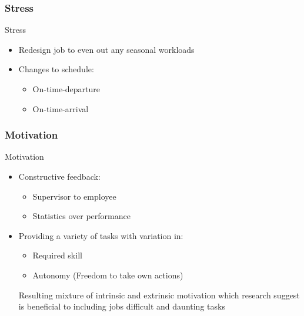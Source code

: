 \subsubsection{Stress}
\begin{frame}{Stress}{}
    \begin{itemize}
        \item Redesign job to even out any seasonal workloads
        \item Changes to schedule:
            \begin{itemize}
                \item On-time-departure
                \item On-time-arrival
            \end{itemize}
    \end{itemize}
\end{frame}

\subsubsection{Motivation}
\begin{frame}{Motivation}{}
    \begin{itemize}
        \item Constructive feedback:
            \begin{itemize}
                \item Supervisor to employee
                \item Statistics over performance
            \end{itemize}
        \item Providing a variety of tasks with variation in:
            \begin{itemize}
                \item Required skill
                \item Autonomy (Freedom to take own actions)
            \end{itemize}
                        Resulting mixture of intrinsic and extrinsic motivation which research suggest is beneficial to including jobs difficult and daunting tasks
    \end{itemize}
\end{frame}
